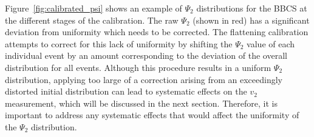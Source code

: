 
Figure~\ref{fig:calibrated_psi} shows an example of $\Psi_2$ distributions for the BBCS at the different stages of the calibration. The raw $\Psi_2$ (shown in red) has a significant deviation from uniformity which needs to be corrected. The flattening calibration attempts to correct for this lack of uniformity by shifting the $\Psi_2$ value of each individual event by an amount corresponding to the deviation of the overall distribution for all events. Although this procedure results in a uniform $\Psi_2$ distribution, applying too large of a correction arising from an exceedingly distorted initial distribution can lead to systematic effects on the $v_2$ measurement, which will be discussed in the next section. Therefore, it is important to address any systematic effects that would affect the uniformity of the $\Psi_2$ distribution.
